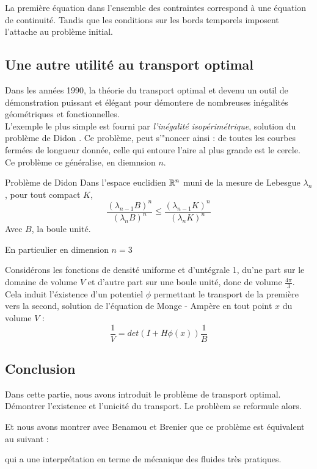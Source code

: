 \documentclass[a4paper,12pt]{article}
\begin{document}
La première équation dans l'ensemble des contraintes correspond à une équation de continuité. Tandis que les conditions sur les bords temporels imposent l'attache au problème initial. 

\subsection{Une autre utilité au transport optimal}
Dans les années 1990, la théorie du transport optimal et devenu un outil de démonstration puissant et élégant pour démontere de nombreuses inégalités géométriques et fonctionnelles. \\
L'exemple le plus simple est fourni par \emph{l'inégalité isopérimétrique}, solution du problème de Didon \cite{Didon}. 
Ce problème, peut s'"noncer ainsi : de toutes les courbes fermées de longueur donnée, celle qui entoure l'aire al plus grande est le cercle. Ce problème ce généralise, en diemnsion $n$.
\begin{theoreme}{Problème de Didon}
Dans l'espace euclidien $\mathbb{R}^n$ muni de la mesure de Lebesgue $\lambda_n$, pour tout compact $K$, 
$$
\frac{(\lambda_{n-1} B)^n}{(\lambda_n B) ^n} \leq \frac{(\lambda_{n-1} K)^n}{(\lambda_n K) ^n}
$$
Avec $B$, la boule unité. 
\end{theoreme}


En particulier en dimension $n=3$ 
\begin{preuve}
Considérons les fonctions de densité uniforme et d'untégrale 1, du'ne part sur le domaine de volume $V$ et d'autre part sur une boule unité, donc de volume $\frac{4\pi}{3}$. Cela induit l'éxistence d'un potentiel $\phi$ permettant le transport de la première vers la second, solution de l'équation de Monge - Ampère en tout point $x$ du volume $V$ : 
$$
\frac{1}{V}=det(I + H\phi (x))\frac{1}{B}
$$

\end{preuve}


\subsection{Conclusion}
Dans cette partie, nous avons introduit le problème de transport optimal. Démontrer l'existence et l'unicité du transport. 
Le problèem se reformule alors. 

Et nous avons montrer avec Benamou et Brenier que ce problème est équivalent au suivant : 

qui a une interprétation en terme de mécanique des fluides très pratiques. \\
\end{document}
